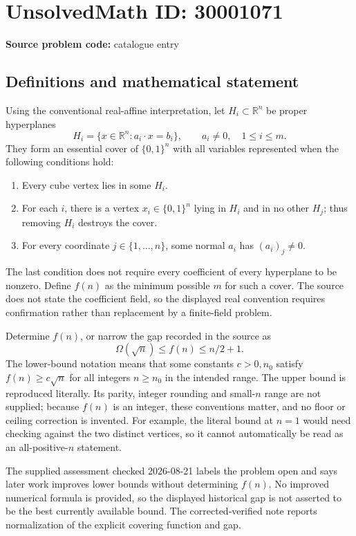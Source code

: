 \documentclass[11pt]{article}
\newcommand{\R}{\mathbb{R}}
\begin{document}
\section*{UnsolvedMath ID: 30001071}
\textbf{Source problem code:} catalogue entry
\subsection{Definitions and mathematical statement}
Using the conventional real-affine interpretation, let $H_i\subset\R^n$ be proper hyperplanes
\[
H_i=\{x\in\R^n:a_i\cdot x=b_i\},\qquad a_i\ne0,\quad 1\leq i\leq m.
\]
They form an essential cover of $\{0,1\}^n$ with all variables represented when the following conditions hold:
\begin{enumerate}
\item Every cube vertex lies in some $H_i$.
\item For each $i$, there is a vertex $x_i\in\{0,1\}^n$ lying in $H_i$ and in no other $H_j$; thus removing $H_i$ destroys the cover.
\item For every coordinate $j\in\{1,\ldots,n\}$, some normal $a_i$ has $(a_i)_j\ne0$.
\end{enumerate}
The last condition does not require every coefficient of every hyperplane to be nonzero. Define $f(n)$ as the minimum possible $m$ for such a cover. The source does not state the coefficient field, so the displayed real convention requires confirmation rather than replacement by a finite-field problem.

Determine $f(n)$, or narrow the gap recorded in the source as
\[
\Omega(\sqrt n)\leq f(n)\leq n/2+1.
\]
The lower-bound notation means that some constants $c>0,n_0$ satisfy $f(n)\geq c\sqrt n$ for all integers $n\geq n_0$ in the intended range. The upper bound is reproduced literally. Its parity, integer rounding and small-$n$ range are not supplied; because $f(n)$ is an integer, these conventions matter, and no floor or ceiling correction is invented. For example, the literal bound at $n=1$ would need checking against the two distinct vertices, so it cannot automatically be read as an all-positive-$n$ statement.

The supplied assessment checked 2026-08-21 labels the problem open and says later work improves lower bounds without determining $f(n)$. No improved numerical formula is provided, so the displayed historical gap is not asserted to be the best currently available bound. The corrected-verified note reports normalization of the explicit covering function and gap.
\end{document}
